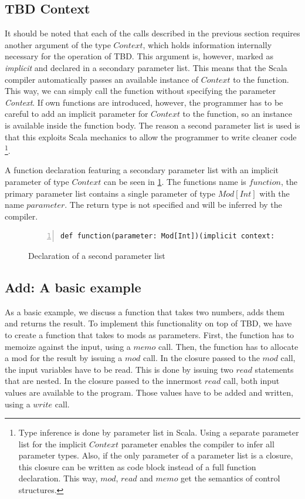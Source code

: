 \subsection{TBD Context} 

It should be noted that each of the calls described in the previous section requires another argument of the type $Context$, which holds information internally necessary for the operation of TBD. This argument is, however, marked as \textit{implicit} and declared in a secondary parameter list. This means that the Scala compiler automatically passes an available instance of $Context$ to the function. This way, we can simply call the function without specifying the parameter \textit{Context}. If own functions are introduced, however, the programmer has to be careful to add an implicit parameter for $Context$ to the function, so an instance is available inside the function body. The reason a second parameter list is used is that this exploits Scala mechanics to allow the programmer to write cleaner code \footnote{Type inference is done by parameter list in Scala. Using a separate parameter list for the implicit $Context$ parameter enables the compiler to infer all parameter types. Also, if the only parameter of a parameter list is a closure, this closure can be written as code block instead of a full function declaration. This way, $mod$, $read$ and $memo$ get the semantics of control structures.}.

A function declaration featuring a secondary parameter list with an implicit parameter of type $Context$ can be seen in \ref{code:second_param}. The functions name is $function$, the primary parameter list contains a single parameter of type $Mod[Int]$ with the name $parameter$. The return type is not specified and will be inferred by the compiler. 

\begin{figure}
\begin{lstlisting}[frame=single,basicstyle=\ttfamily,numbers=left]
def function(parameter: Mod[Int])(implicit context: Context)
\end{lstlisting}
\caption{Declaration of a second parameter list}
\label{code:second_param}
\end{figure}

\subsection{Add: A basic example}
\label{sec:tbd_basic_example}
As a basic example, we discuss a function that takes two numbers, adds them and returns the result. To implement this functionality on top of TBD, we have to create a function that takes to mods as parameters. First, the function has to memoize against the input, using a $memo$ call. Then, the function has to allocate a mod for the result by issuing a $mod$ call. In the closure passed to the $mod$ call, the input variables have to be read. This is done by issuing two $read$ statements that are nested. In the closure passed to the innermost $read$ call, both input values are available to the program. Those values have to be added and written, using a $write$ call. 

